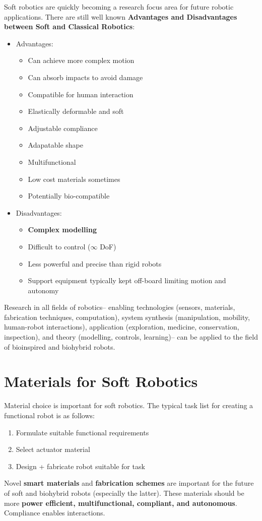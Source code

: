 \documentclass[onecolumn,a4paper]{article}
\begin{document}
Soft robotics are quickly becoming a research focus area for future robotic applications. There are still well known \textbf{Advantages and Disadvantages between Soft and Classical Robotics}:
\begin{itemize}
    \item Advantages:
    \begin{itemize}
        \item Can achieve more complex motion
        \item Can absorb impacts to avoid damage
        \item Compatible for human interaction
        \item Elastically deformable and soft
        \item Adjustable compliance
        \item Adapatable shape
        \item Multifunctional
        \item Low cost materials sometimes
        \item Potentially bio-compatible
    \end{itemize}
    \item Disadvantages:
    \begin{itemize}
        \item \textbf{Complex modelling}
        \item Difficult to control ($\infty$ DoF)
        \item Less powerful and precise than rigid robots
        \item Support equipment typically kept off-board limiting motion and autonomy
    \end{itemize}
\end{itemize}
Research in all fields of robotics-- enabling technologies (sensors, materials, fabrication techniques, computation), system synthesis (manipulation, mobility, human-robot interactions), application (exploration, medicine, conservation, inspection), and theory (modelling, controls, learning)-- can be applied to the field of bioinspired and biohybrid robots.



\section{Materials for Soft Robotics}
Material choice is important for soft robotics. The typical task list for creating a functional robot is as follows:
\begin{enumerate}
    \item Formulate suitable functional requirements
    \item Select actuator material
    \item Design + fabricate robot suitable for task
\end{enumerate}
Novel \textbf{smart materials} and \textbf{fabrication schemes} are important for the future of soft and biohybrid robots (especially the latter). These materials should be more \textbf{power efficient, multifunctional, compliant, and autonomous}. Compliance enables interactions.
\end{document}
